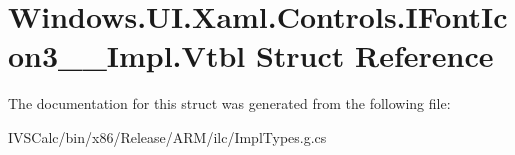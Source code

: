 \hypertarget{struct_windows_1_1_u_i_1_1_xaml_1_1_controls_1_1_i_font_icon3_____impl_1_1_vtbl}{}\section{Windows.\+U\+I.\+Xaml.\+Controls.\+I\+Font\+Icon3\+\_\+\+\_\+\+Impl.\+Vtbl Struct Reference}
\label{struct_windows_1_1_u_i_1_1_xaml_1_1_controls_1_1_i_font_icon3_____impl_1_1_vtbl}


The documentation for this struct was generated from the following file\+:\begin{DoxyCompactItemize}
\item 
I\+V\+S\+Calc/bin/x86/\+Release/\+A\+R\+M/ilc/Impl\+Types.\+g.\+cs\end{DoxyCompactItemize}
